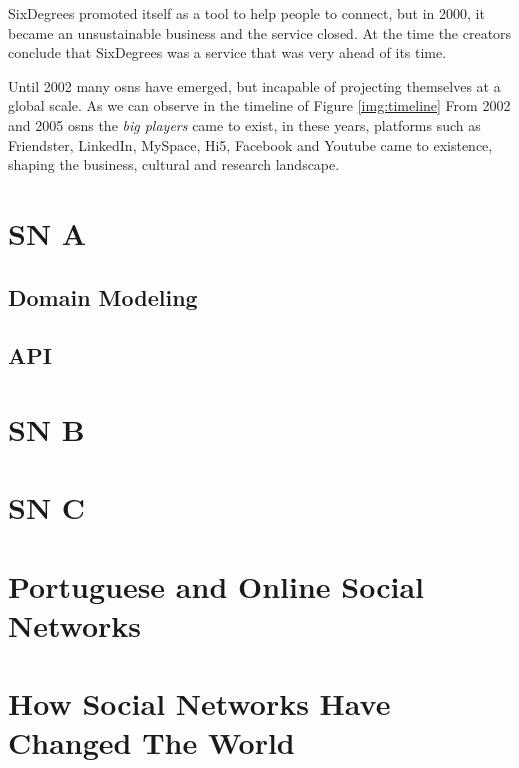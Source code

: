 SixDegrees promoted itself as a tool to help people to connect, but in 2000, it became an
unsustainable business and the service closed. At the time the creators conclude that
SixDegrees was a service that was very ahead of its time.

Until 2002 many \glspl{osn} have emerged, but incapable of projecting themselves at a global scale.
As we can observe in the timeline of Figure \ref{img:timeline} From 2002 and 2005 \glspl{osn} the \textit{big players} came to exist, in these years, platforms
such as Friendster, LinkedIn, MySpace, Hi5, Facebook and Youtube came to existence, shaping the business, cultural
and research landscape.


\section{SN A}
\subsection{Domain Modeling}
\subsection{API}
\section{SN B}
\section{SN C}
\section{Portuguese and Online Social Networks}
\section{How Social Networks Have Changed The World}
